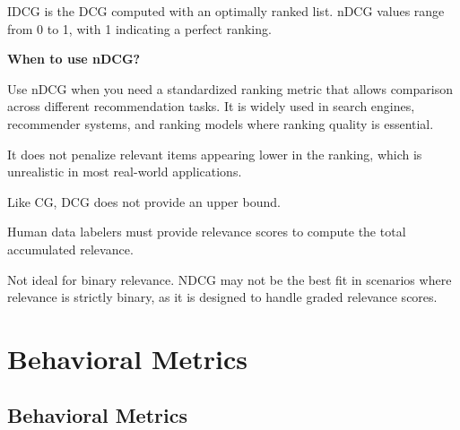 IDCG is the DCG computed with an optimally ranked list. nDCG values range from 0 to 1, with 1 indicating a perfect ranking.

\textbf{When to use nDCG?}

Use nDCG when you need a standardized ranking metric that allows comparison across different recommendation tasks.
It is widely used in search engines, recommender systems, and ranking models where ranking quality is essential.

{
    \item It does not penalize relevant items appearing lower in the ranking, which is
    unrealistic in most real-world applications.
    \item Like CG, DCG does not provide an upper bound.
    \item Human data labelers must provide relevance scores to compute the total accumulated relevance.
    \item Not ideal for binary relevance. NDCG may not be the best fit in scenarios where relevance is strictly binary, as it
    is designed to handle graded relevance scores.
}


\clearpage
\thispagestyle{rankingstyle}
\section{Behavioral Metrics}
\subsection{Behavioral Metrics}


